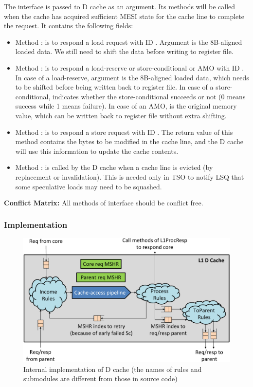 The  interface is passed to D cache as an argument.
Its methods will be called when the cache has acquired sufficient MESI state for the cache line to complete the request.
It contains the following fields:
\begin{itemize}
    \item Method : is to respond a load request with ID .
    Argument  is the 8B-aligned loaded data.
    We still need to shift the data before writing to register file.
    \item Method : is to respond a load-reserve or store-conditional or AMO with ID .
    In case of a load-reserve, argument  is the 8B-aligned loaded data, which needs to be shifted before being written back to register file.
    In case of a store-conditional,  indicates whether the store-conditional succeeds or not (0 means success while 1 means failure).
    In case of an AMO,  is the original memory value, which can be written back to register file without extra shifting.
    \item Method : is to respond a store request with ID .
    The return value of this method contains the bytes to be modified in the cache line, and the D cache will use this information to update the cache contents.
    \item Method : is called by the D cache when a cache line is evicted (by replacement or invalidation).
    This is needed only in TSO to notify LSQ that some speculative loads may need to be squashed.
\end{itemize}

\noindent\textbf{Conflict Matrix:}
All methods of interface  should be conflict free.

\subsubsection{Implementation}

\begin{figure}[t]
    \centering
    \includegraphics[width=\columnwidth]{fig/d_cache_crop.pdf}
    \caption{Internal implementation of D cache (the names of rules and submodules are different from those in source code)}\label{fig:d-cache-impl}
\end{figure}

